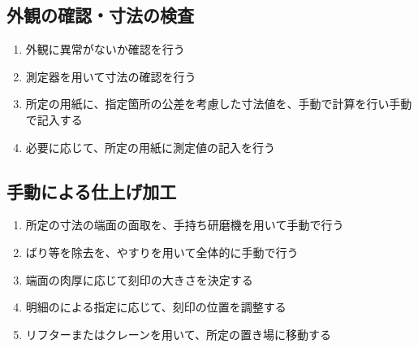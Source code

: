 \subsection{外観の確認・寸法の検査}
\begin{enumerate}
\item {}外観に異常がないか確認を行う
\item {}測定器を用いて寸法の確認を行う
\item 所定の用紙に、指定箇所の公差を考慮した寸法値を、手動で計算を行い手動で記入する
\item 必要に応じて、所定の用紙に測定値の記入を行う
\end{enumerate}


\subsection{手動による仕上げ加工}
\begin{enumerate}
\item 所定の寸法の端面の面取を、手持ち研磨機を用いて手動で行う
\item {}ばり等を除去を、やすりを用いて全体的に手動で行う
\item {}端面の肉厚に応じて刻印の大きさを決定する
\item 明細のによる指定に応じて、刻印の位置を調整する
\item リフターまたはクレーンを用いて、所定の置き場に移動する
\end{enumerate}

